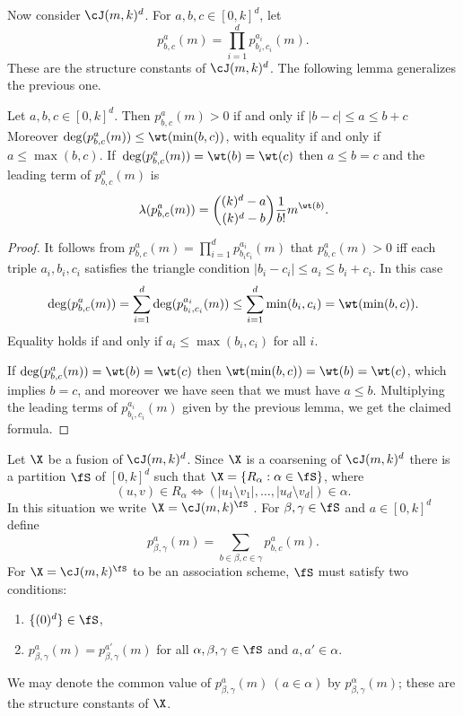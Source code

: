 Now consider $\cJ(m, k)^d$.
For $a, b, c \in [0,k]^d$, let
\[
    p^a_{b,c}(m) = \prod_{i=1}^d p^{a_i}_{b_i,c_i}(m).
\]
These are the structure constants of $\cJ(m, k)^d$.
The following lemma generalizes the previous one.

\begin{lemma}
    Let $a,b,c\in[0,k]^d$.
    Then $p^a_{b,c}(m) > 0$ if and only if $|b-c| \leq a \leq b + c$
    Moreover $\deg(p_{b,c}^a(m)) \leq \wt(\min(b, c))$, with equality if and only if $a \leq \max(b, c)$.
    If~$\deg(p_{b,c}^a(m)) = \wt(b) = \wt(c)$ then $a \leq b = c$ and the leading term of $p^a_{b,c}(m)$ is
    \[
        \lambda(p^a_{b,c}(m))
        = \binom{(k)^d - a}{(k)^d - b} \frac{1}{b!} m^{\wt(b)}.
    \]
\end{lemma}
\begin{proof}
    It follows from $p_{b,c}^a(m) = \prod_{i=1}^d p_{b_i c_i}^{a_i}(m)$ that $p_{b,c}^a(m)>0$ iff each triple $a_i,b_i,c_i$ satisfies the triangle condition $|b_i-c_i|\leq a_i \leq b_i+c_i$. In this case
    \[
        \deg(p_{b,c}^a(m)) = \sum_{i=1}^d \deg(p_{b_i, c_i}^{a_i}(m))\leq \sum_{i=1}^d\min(b_i,c_i) = \wt(\min(b, c)).
    \]
    Equality holds if and only if $a_i \leq \max(b_i, c_i)$ for all $i$.
    
    If $\deg(p_{b,c}^a(m)) = \wt(b) = \wt(c)$ then $\wt(\min(b, c)) = \wt(b) = \wt(c)$, which implies $b = c$, and moreover we have seen that we must have $a \leq b$.
    Multiplying the leading terms of $p^{a_i}_{b_i,c_i}(m)$ given by the previous lemma, we get the claimed formula.
\end{proof}


Let $\X$ be a fusion of $\cJ(m, k)^d$.
Since $\X$ is a coarsening of $\cJ(m, k)^d$ there is a partition $\fS$ of $[0,k]^d$ such that $\X = \{R_\alpha : \alpha \in \fS\}$, where
\[
    (u, v) \in R_\alpha \iff (|u_1 \setminus v_1|, \dots, |u_d \setminus v_d|) \in \alpha.
\]
In this situation we write $\X = \cJ(m, k)^\fS$ \cite[Section~4]{E}.
For $\beta, \gamma \in \fS$ and $a \in [0,k]^d$ define
\[
    p^a_{\beta,\gamma}(m) = \sum_{b\in \beta, c \in \gamma} p^a_{b,c}(m).
\]
For $\X = \cJ(m,k)^\fS$ to be an association scheme, $\fS$ must satisfy two conditions:
\begin{enumerate}
    \item $\{(0)^d\} \in \fS$,
    \item $p^a_{\beta,\gamma}(m) = p^{a'}_{\beta,\gamma}(m)$ for all $\alpha,\beta,\gamma \in \fS$ and $a,a' \in \alpha$.
\end{enumerate}
We may denote the common value of $p^a_{\beta,\gamma}(m) ~ (a\in\alpha)$ by $p^\alpha_{\beta,\gamma}(m)$; these are the structure constants of $\X$.


